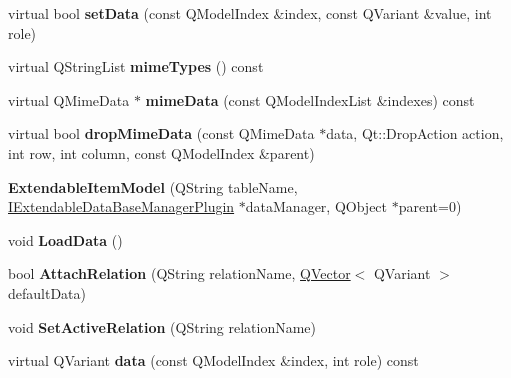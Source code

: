 \begin{DoxyCompactItemize}
virtual bool {\bfseries set\+Data} (const Q\+Model\+Index \&index, const Q\+Variant \&value, int role)
\item 
\mbox{\label{class_extendable_item_model_a5e875f885ba62365a738a7820ceb8e4c}} 
virtual Q\+String\+List {\bfseries mime\+Types} () const
\item 
\mbox{\label{class_extendable_item_model_ae2e75332303501a90e0fb5b8cebef1d7}} 
virtual Q\+Mime\+Data $\ast$ {\bfseries mime\+Data} (const Q\+Model\+Index\+List \&indexes) const
\item 
\mbox{\label{class_extendable_item_model_ae6dc27740bcfff8ecd88e3af76f7d3ac}} 
virtual bool {\bfseries drop\+Mime\+Data} (const Q\+Mime\+Data $\ast$data, Qt\+::\+Drop\+Action action, int row, int column, const Q\+Model\+Index \&parent)
\item 
\mbox{\label{class_extendable_item_model_a896f75df752535510036e0c5d42fac8a}} 
{\bfseries Extendable\+Item\+Model} (Q\+String table\+Name, \hyperlink{class_i_extendable_data_base_manager_plugin}{I\+Extendable\+Data\+Base\+Manager\+Plugin} $\ast$data\+Manager, Q\+Object $\ast$parent=0)
\item 
\mbox{\label{class_extendable_item_model_ae5887f5d5086a094d712e2f7a1f6b84b}} 
void {\bfseries Load\+Data} ()
\item 
\mbox{\label{class_extendable_item_model_a49139d270880dc35b44b51bd95a36e89}} 
bool {\bfseries Attach\+Relation} (Q\+String relation\+Name, \hyperlink{class_q_vector}{Q\+Vector}$<$ Q\+Variant $>$ default\+Data)
\item 
\mbox{\label{class_extendable_item_model_ad5ce2033c7ba133259dc5c46a98e4694}} 
void {\bfseries Set\+Active\+Relation} (Q\+String relation\+Name)
\item 
\mbox{\label{class_extendable_item_model_aa9ef36b1912f6a510541509df53e9e03}} 
virtual Q\+Variant {\bfseries data} (const Q\+Model\+Index \&index, int role) const
\item 
\mbox{\label{class_extendable_item_model_a71d1609484e15a16e2a07c54aa465381}} 

\end{DoxyCompactItemize}
